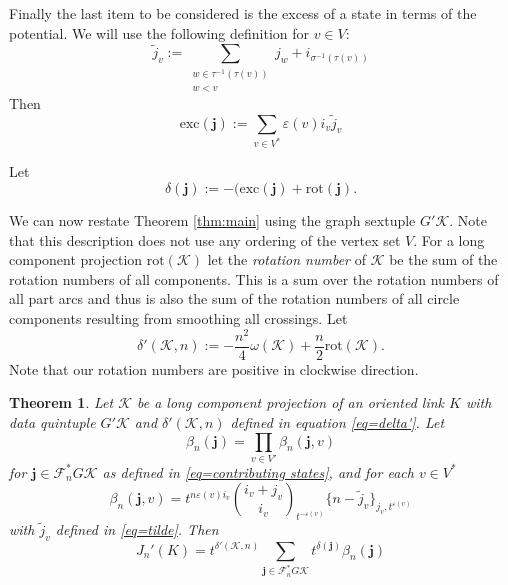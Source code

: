 \documentclass[11pt]{article}
\newtheorem{thm}{Theorem}[section]
\theoremstyle{definition}
\theoremstyle{remark}
\theoremstyle{remark}
\begin{document}
Finally the last item to be considered is the excess of a state in terms of the potential. We will use the following definition for $v\in V$:
\begin{equation}\label{eq=tilde}
\tilde{j}_v:=\sum_{\substack{w\in \tau^{-1}(\tau (v))\\ w<v}}j_w+i_{\sigma^{-1}(\tau(v))}
\end{equation}
Then 
\begin{equation}\label{eq=excess}
\textrm{exc}(\mathbf{j}):=\sum_{v\in V^*}\varepsilon (v)i_v\tilde{j}_v
\end{equation}

Let
\begin{equation}
\delta (\mathbf{j}):=-(\textrm{exc}(\mathbf{j})+\textrm{rot}(\mathbf{j}).
\end{equation}

We can now restate Theorem \ref{thm:main} using the graph sextuple $G'\mathcal{K}$. Note that this description does not use any ordering of the vertex set $V$. For a long component projection $\textrm{rot}(\mathcal{K})$ let the \textit{rotation number} of $\mathcal{K}$ be the sum of the rotation numbers of all components. This is a sum over the rotation numbers of all part arcs and thus is also the sum of the rotation numbers of all circle components resulting from smoothing all crossings. Let 
\begin{equation}\label{eq=delta'}
\delta '(\mathcal{K},n):=-\frac{n^2}{4}\omega (\mathcal{K})+\frac{n}{2}\textrm{rot}(\mathcal{K}).
\end{equation}
Note that our rotation numbers are positive in clockwise direction. 

\begin{thm}\label{thm:GL2}
Let $\mathcal{K}$ be a long component projection of an oriented link $K$ with data quintuple $G'\mathcal{K}$ and $\delta '(\mathcal{K},n)$ defined in equation \eqref{eq=delta'}. Let
$$\beta_n(\mathbf{j})=\prod_{v\in V'}\beta_n(\mathbf{j},v)$$
for $\mathbf{j}\in \mathcal{F}_n^*G\mathcal{K}$
as defined in \eqref{eq=contributing states}, and for each $v\in V^*$
\begin{equation}\label{eq=vertex contribution}
\beta_n(\mathbf{j},v)=t^{n\varepsilon (v)i_v}{i_v+j_v \choose i_v}_{t^{-\varepsilon (v)}} \{n-\tilde{j}_v\}_{j_v,t^{\varepsilon (v)}}
\end{equation}
with $\tilde{j}_v$ defined in \eqref{eq=tilde}.
Then 
\begin{equation}\label{eqn=GL2}
J_n'(K)=t^{\delta '(\mathcal{K},n)}\sum_{\mathbf{j}\in \mathcal{F}_n^*G\mathcal{K}}t^{\delta (\mathbf{j})}\beta_n(\mathbf{j})
\end{equation}
\end{thm}
\end{document}
